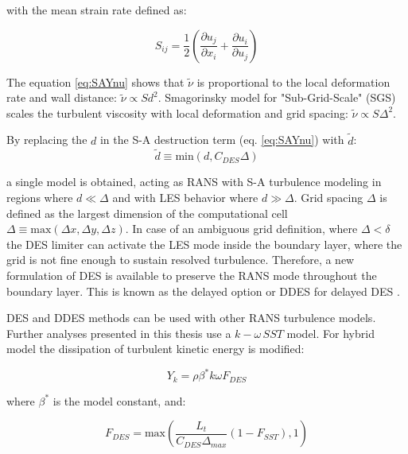 \noindent with the mean strain rate defined as:

\begin{equation} \label{eq:SAdeform4}
S_{ij} = \frac{1}{2} \left( \frac{\partial u_j}{\partial x_i} + \frac{\partial u_i}{\partial u_j}\right)
\end{equation}

The equation \ref{eq:SAYnu} shows that $\tilde{\nu}$ is proportional to the local deformation rate and wall distance: $\tilde{\nu} \propto Sd^2$. Smagorinsky model for "Sub-Grid-Scale" (SGS) scales the turbulent viscosity with local deformation and grid spacing: $\tilde{\nu} \propto S \Delta^2$.

By replacing the $d$ in the S-A destruction term (eq. \ref{eq:SAYnu}) with $\tilde{d}$:
\begin{equation} \label{eq:tilded}
\tilde{d} \equiv \text{min} \left(d, C_{DES} \Delta \right)
\end{equation}

\noindent a single model is obtained, acting as RANS with S-A turbulence modeling in regions where $d \ll \Delta$ and with LES behavior where $d \gg \Delta$. Grid spacing $\Delta$ is defined as the largest dimension of the computational cell $\Delta \equiv \text{max}\left( \Delta x, \Delta y, \Delta z\right)$.  In case of an ambiguous grid definition, where $\Delta < \delta$ the DES limiter can activate the LES mode inside the boundary layer, where the grid is not fine enough to sustain resolved turbulence. Therefore, a new formulation \citep{ddesspalart} of DES is available to preserve the RANS mode throughout the boundary layer. This is known as the delayed option or DDES for delayed DES \citep{fluenttheory}.

DES and DDES methods can be used with other RANS turbulence models. Further analyses presented in this thesis use a $k-\omega \, SST$ model. For hybrid model the dissipation of turbulent kinetic energy is modified:

\begin{equation} \label{eq:deskoYk}
Y_k = \rho \beta^{*} k \omega F_{DES}
\end{equation}

\noindent where $\beta^{*}$ is the model constant, and:

\begin{equation} \label{eq:deskoFdes}
F_{DES} = \text{max}\left( \frac{L_t}{C_{DES} \Delta_{max}}\left( 1-F_{SST} \right), 1 \right)
\end{equation}

